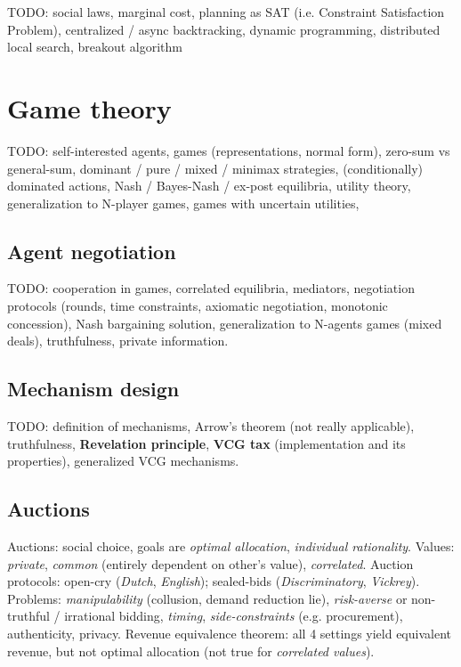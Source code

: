 \documentclass[10pt,a4paper,landscape]{article}
\newcommand{\concept}[1]{\textcolor{Emerald}{#1}} %
\newcommand{\subconcept}[1]{\textit{#1}}
\begin{document}
\begin{multicols*}{4}
TODO: social laws, marginal cost, planning as SAT (i.e. Constraint Satisfaction Problem), centralized / async backtracking, dynamic programming, distributed local search, breakout algorithm

\section{Game theory}

TODO: self-interested agents, games (representations, normal form), zero-sum vs general-sum, dominant / pure / mixed / minimax strategies, (conditionally) dominated actions, Nash / Bayes-Nash / ex-post equilibria, utility theory, generalization to N-player games, games with uncertain utilities,

\subsection{Agent negotiation}

TODO: cooperation in games, correlated equilibria, mediators, negotiation protocols (rounds, time constraints, axiomatic negotiation, monotonic concession), Nash bargaining solution, generalization to N-agents games (mixed deals), truthfulness, private information.

\subsection{Mechanism design}

TODO: definition of mechanisms, Arrow's theorem (not really applicable), truthfulness, \textbf{Revelation principle}, \textbf{VCG tax} (implementation and its properties), generalized VCG mechanisms.

\subsection{Auctions}

\concept{Auctions}: social choice, goals are \subconcept{optimal allocation}, \subconcept{individual rationality}.
\concept{Values}: \subconcept{private}, \subconcept{common} (entirely dependent on other's value), \subconcept{correlated}.
\concept{Auction protocols}: open-cry (\subconcept{Dutch}, \subconcept{English}); sealed-bids (\subconcept{Discriminatory}, \subconcept{Vickrey}). Problems: \subconcept{manipulability} (collusion, demand reduction lie), \subconcept{risk-averse} or non-truthful / irrational bidding, \subconcept{timing}, \subconcept{side-constraints} (e.g. procurement), authenticity, privacy.
\concept{Revenue equivalence theorem}: all 4 settings yield equivalent revenue, but not optimal allocation (not true for \subconcept{correlated values}).


\end{multicols*}
\end{document}
